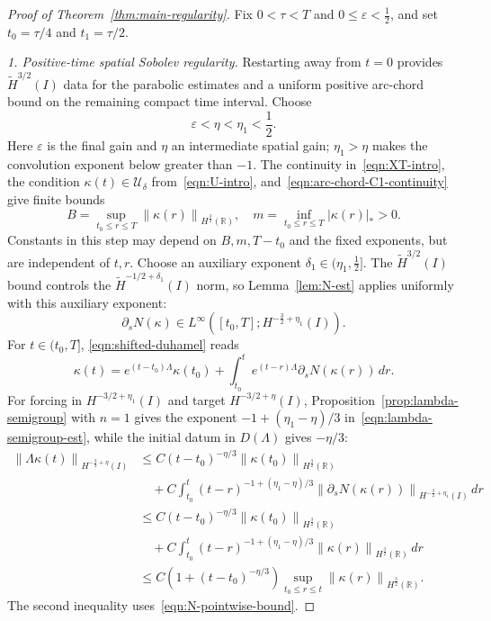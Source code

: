 \documentclass[11pt,reqno]{amsart}
\theoremstyle{plain}
\theoremstyle{definition}
\numberwithin{equation}{section}
\newcommand{\paren}[1]{\left(#1\right)}
\newcommand{\p}{\partial}
\newcommand{\mc}[1]{\mathcal{#1}}
\newcommand{\wt}[1]{\widetilde{#1}}
\newcommand{\abs}[1]{\left\lvert #1 \right\rvert}
\newcommand{\norm}[1]{\left\lVert #1 \right\rVert}
\newcommand{\R}{\mathbb{R}}
\newcommand{\hi}[1]{H^{#1}(I)}
\newcommand{\thi}[1]{\wt H^{#1}(I)}
\newcommand{\hr}[1]{H^{#1}(\R)}
\begin{document}
\begin{proof}[Proof of Theorem~\ref{thm:main-regularity}]
Fix $0<\tau<T$ and $0\le\varepsilon<\frac12$, and set
$t_0=\tau/4$ and $t_1=\tau/2$.

\emph{1. Positive-time spatial Sobolev regularity.}
Restarting away from $t=0$ provides $\thi{3/2}$ data for the parabolic
estimates and a uniform positive arc-chord bound on the remaining
compact time interval. Choose
\begin{equation*}
    \varepsilon<\eta<\eta_1<\frac12.
\end{equation*}
Here $\varepsilon$ is the final gain and $\eta$ an intermediate spatial
gain; $\eta_1>\eta$ makes the convolution exponent below greater than $-1$.
The continuity in~\eqref{eqn:XT-intro}, the condition $\kappa(t)\in\mc U_\delta$ from~\eqref{eqn:U-intro}, and~\eqref{eqn:arc-chord-C1-continuity} give finite bounds
\begin{equation*}
    B=\sup_{t_0\le r\le T}\norm{\kappa(r)}_{\hr{\frac32}},
    \quad m=\inf_{t_0\le r\le T}\abs{\kappa(r)}_*>0.
\end{equation*}
Constants in this step may depend on $B,m,T-t_0$ and the fixed
exponents, but are independent of $t,r$.
Choose an auxiliary exponent $\delta_1\in(\eta_1,\frac12]$.
The $\thi{3/2}$ bound controls the $\thi{-1/2+\delta_1}$ norm, so
Lemma~\ref{lem:N-est} applies uniformly with this auxiliary exponent:
\begin{equation}\label{eqn:pN-low}
    \p_sN(\kappa)\in
    L^\infty\paren{[t_0,T];\hi{-\frac32+\eta_1}}.
\end{equation}
For $t\in(t_0,T]$, \eqref{eqn:shifted-duhamel} reads
\begin{equation}\label{eqn:mild-reg}
    \kappa(t)=e^{(t-t_0)\Lambda}\kappa(t_0)
    +\int_{t_0}^t e^{(t-r)\Lambda}\p_sN(\kappa(r))\,dr.
\end{equation}
For forcing in $H^{-3/2+\eta_1}(I)$ and target $H^{-3/2+\eta}(I)$,
Proposition~\ref{prop:lambda-semigroup} with $n=1$ gives the exponent
$-1+(\eta_1-\eta)/3$ in~\eqref{eqn:lambda-semigroup-est}, while the
initial datum in $D(\Lambda)$ gives $-\eta/3$:
\begin{equation}\label{eqn:Lam-32}
\begin{aligned}
    \norm{\Lambda\kappa(t)}_{\hi{-\frac32+\eta}}
    &\le C(t-t_0)^{-\eta/3}\norm{\kappa(t_0)}_{\hr{\frac32}}\\
    &\quad+C\int_{t_0}^t
        (t-r)^{-1+(\eta_1-\eta)/3}
        \norm{\p_sN(\kappa(r))}_{\hi{-\frac32+\eta_1}}\,dr\\
    &\le C(t-t_0)^{-\eta/3}\norm{\kappa(t_0)}_{\hr{\frac32}}\\
    &\quad+C\int_{t_0}^t
        (t-r)^{-1+(\eta_1-\eta)/3}
        \norm{\kappa(r)}_{\hr{\frac32}}\,dr\\
    &\le C\paren{1+(t-t_0)^{-\eta/3}}
        \sup_{t_0\le r\le t}\norm{\kappa(r)}_{\hr{\frac32}}.
\end{aligned}
\end{equation}
The second inequality uses~\eqref{eqn:N-pointwise-bound}.


\end{proof}
\end{document}

